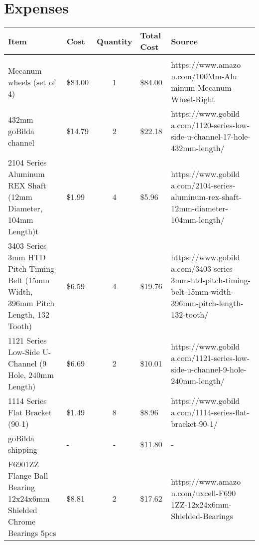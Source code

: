 

\section{Expenses}

\begin{longtable}{p{}  p{}  c  p{}  p{}}

    \textbf{Item} & \textbf{Cost} & \textbf{Quantity} & \textbf{Total Cost} & \textbf{Source}\\
    \toprule
    \hspace{1in}\\
    
    Mecanum wheels (set of 4) & \$84.00 & 1 & \$84.00 & https://www.amazo n.com/100Mm-Alu minum-Mecanum-Wheel-Right\\
    
    432mm goBilda channel & \$14.79 & 2 & \$22.18 & https://www.gobild a.com/1120-series-low-side-u-channel-17-hole-432mm-length/\\
    
    2104 Series Aluminum REX Shaft (12mm Diameter, 104mm Length)t & \$1.99 & 4 &\$5.96 & https://www.gobild a.com/2104-series-aluminum-rex-shaft-12mm-diameter-104mm-length/\\
    
    3403 Series 3mm HTD Pitch Timing Belt (15mm Width, 396mm Pitch Length, 132 Tooth) & \$6.59 & 4 & \$19.76 & https://www.gobild a.com/3403-series-3mm-htd-pitch-timing-belt-15mm-width-396mm-pitch-length-132-tooth/\\
    
    1121 Series Low-Side U-Channel (9 Hole, 240mm Length) & \$6.69 & 2 & \$10.01 & https://www.gobild a.com/1121-series-low-side-u-channel-9-hole-240mm-length/\\
    
    1114 Series Flat Bracket (90-1) & \$1.49 & 8 & \$8.96 & https://www.gobild a.com/1114-series-flat-bracket-90-1/\\
    
    goBilda shipping & - & - & \$11.80 & - \\
    
    F6901ZZ Flange Ball Bearing 12x24x6mm Shielded Chrome Bearings 5pcs & \$8.81 & 2 & \$17.62 & https://www.amazo n.com/uxcell-F690 1ZZ-12x24x6mm-Shielded-Bearings\\
    

\end{longtable}
